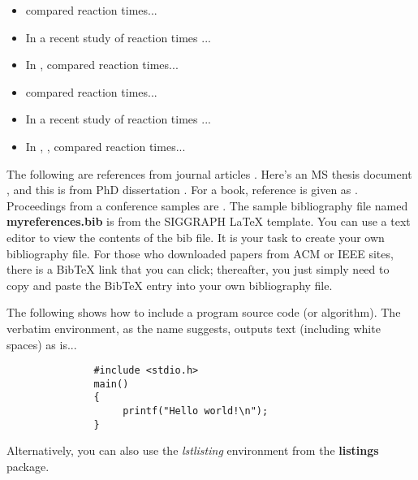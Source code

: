 \begin{itemize}
 \item {} compared reaction times...
 \item In a recent study of reaction times \cite{kartch:2000:ERA}...
 \item In , \citeauthor{kartch:2000:ERA} compared reaction times...
 \item {} compared reaction times... 
 \item In a recent study of reaction times \cite{fedkiw:2001:VSO}...
 \item In , , compared reaction times...
\end{itemize}

The following are references from journal articles \cite{Park:2006:DSI, Pellacini:2005:LAH, sako:2001:SSB}.
 Here's an MS thesis document \cite{yee:2000:SSA}, and this is from PhD dissertation \cite{kartch:2000:ERA}. 
 For a book, reference is given as  \cite{parke:1996:CFA}. 
 Proceedings from a conference samples are \cite{Jobs95, fedkiw:2001:VSO, levoy:2000:TDM}.  
 The sample bibliography file named \textbf{myreferences.bib} is from the SIGGRAPH \LaTeX{}  template.  
 You can use a text editor to view the contents of the bib file.  
 It is your task to create your own bibliography file.  
 For those who downloaded papers from ACM or IEEE sites, there is a BibTeX link that you can click; thereafter, you just simply need to copy and paste the BibTeX entry into your own bibliography file.

The following shows how to include a program source code (or algorithm).  
The verbatim environment, as the name suggests, outputs text (including white spaces) as is...

\begin{verbatim}
               #include <stdio.h>
               main()
               {
                    printf("Hello world!\n");
               }
\end{verbatim}

Alternatively, you can also use the \emph{lstlisting} environment from the \textbf{listings} package.

